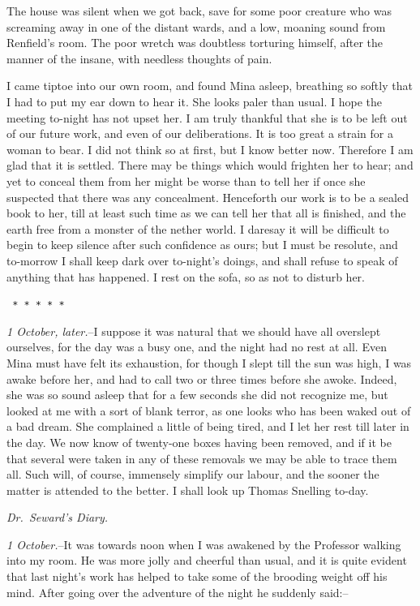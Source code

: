\documentclass[12pt,openright]{book}
\begin{document}
The house was silent when we got back, save for some poor creature who was screaming away in one of the distant wards, and a low, moaning sound from Renfield’s room. The poor wretch was doubtless torturing himself, after the manner of the insane, with needless thoughts of pain.

I came tiptoe into our own room, and found Mina asleep, breathing so softly that I had to put my ear down to hear it. She looks paler than usual. I hope the meeting to-night has not upset her. I am truly thankful that she is to be left out of our future work, and even of our deliberations. It is too great a strain for a woman to bear. I did not think so at first, but I know better now. Therefore I am glad that it is settled. There may be things which would frighten her to hear; and yet to conceal them from her might be worse than to tell her if once she suspected that there was any concealment. Henceforth our work is to be a sealed book to her, till at least such time as we can tell her that all is finished, and the earth free from a monster of the nether world. I daresay it will be difficult to begin to keep silence after such confidence as ours; but I must be resolute, and to-morrow I shall keep dark over to-night’s doings, and shall refuse to speak of anything that has happened. I rest on the sofa, so as not to disturb her.

\texttt{   *       *       *       *       *}

\textit{1 October, later.}–I suppose it was natural that we should have all overslept ourselves, for the day was a busy one, and the night had no rest at all. Even Mina must have felt its exhaustion, for though I slept till the sun was high, I was awake before her, and had to call two or three times before she awoke. Indeed, she was so sound asleep that for a few seconds she did not recognize me, but looked at me with a sort of blank terror, as one looks who has been waked out of a bad dream. She complained a little of being tired, and I let her rest till later in the day. We now know of twenty-one boxes having been removed, and if it be that several were taken in any of these removals we may be able to trace them all. Such will, of course, immensely simplify our labour, and the sooner the matter is attended to the better. I shall look up Thomas Snelling to-day.

\textit{Dr. Seward’s Diary.}

\textit{1 October.}–It was towards noon when I was awakened by the Professor walking into my room. He was more jolly and cheerful than usual, and it is quite evident that last night’s work has helped to take some of the brooding weight off his mind. After going over the adventure of the night he suddenly said:–
\end{document}
